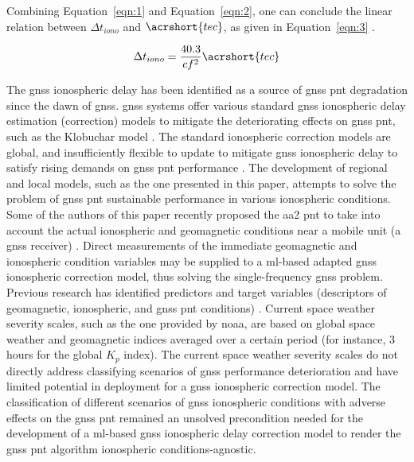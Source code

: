 \let\LaTeXcline\cline\documentclass[sn-mathphys-num]{sn-jnl}\let\cline\LaTeXcline
\begin{document}
Combining Equation~\ref{eqn:1} and Equation~\ref{eqn:2}, one can conclude the linear relation between $\Delta t_{iono}$ and $\acrshort{tec}$, as given in Equation~\ref{eqn:3} \cite{spilker1996global}.

\begin{equation}
	\Delta t_{iono} = \frac{40.3}{c f^{2}} \acrshort{tec}
	\label{eqn:3}
\end{equation}

The \acrshort{gnss} ionospheric delay has been identified as a source of \acrshort{gnss} \acrshort{pnt} degradation since the dawn of \acrshort{gnss}. \acrshort{gnss} systems offer various standard \acrshort{gnss} ionospheric delay estimation (correction) models to mitigate the deteriorating effects on \acrshort{gnss} \acrshort{pnt}, such as the Klobuchar model \cite{spilker1996global, klobuchar1987ionospheric}. The standard ionospheric correction models are global, and insufficiently flexible to update to mitigate \acrshort{gnss} ionospheric delay to satisfy rising demands on \acrshort{gnss} \acrshort{pnt} performance \cite{spilker1996global, enge1994global}. The development of regional and local models, such as the one presented in this paper, attempts to solve the problem of \acrshort{gnss} \acrshort{pnt} sustainable performance in various ionospheric conditions. Some of the authors of this paper recently proposed the \acrfull{aa2} \acrshort{pnt} to take into account the actual ionospheric and geomagnetic conditions near a mobile unit (a \acrshort{gnss} receiver) \cite{filjar2024ambient}. Direct measurements of the immediate geomagnetic and ionospheric condition variables may be supplied to a \acrlong{ml}-based adapted \acrshort{gnss} ionospheric correction model, thus solving the single-frequency \acrshort{gnss} problem. Previous research has identified predictors and target variables (descriptors of geomagnetic, ionospheric, and \acrshort{gnss} \acrshort{pnt} conditions) \cite{natras2022ensemble, natras2023regional}. Current space weather severity scales, such as the one provided by \acrfull{noaa}, are based on global space weather and geomagnetic indices averaged over a certain period (for instance, $3$ hours for the global $K_{p}$ index). The current space weather severity scales do not directly address classifying scenarios of \acrshort{gnss} performance deterioration and have limited potential in deployment for a \acrshort{gnss} ionospheric correction model. The classification of different scenarios of \acrshort{gnss} ionospheric conditions with adverse effects on the \acrshort{gnss} \acrshort{pnt} remained an unsolved precondition needed for the development of a \acrlong{ml}-based \acrshort{gnss} ionospheric delay correction model to render the \acrshort{gnss} \acrshort{pnt} algorithm ionospheric conditions-agnostic.
\end{document}
